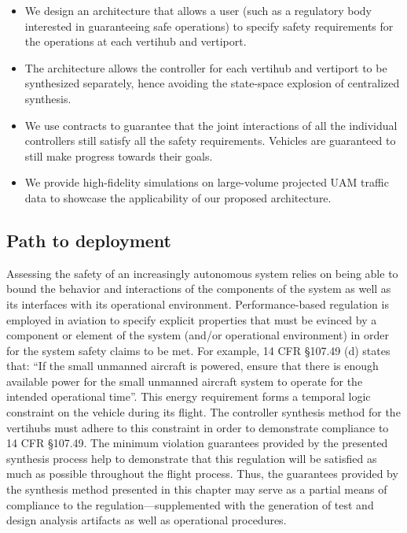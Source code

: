 \begin{itemize}
	\item We design an architecture that allows a user (such as a regulatory body interested in guaranteeing safe operations) to specify safety requirements for the operations at each vertihub and vertiport. 
	\item The architecture allows the controller for each vertihub and vertiport to be synthesized separately, hence avoiding the state-space explosion of centralized synthesis. 
	\item We use contracts to guarantee that the joint interactions of all the individual controllers still satisfy all the safety requirements. Vehicles are guaranteed to still make progress towards their goals. 
	\item We provide high-fidelity simulations on large-volume projected UAM traffic data to showcase the applicability of our proposed architecture.
\end{itemize}

\subsection{Path to deployment}

Assessing the safety of an increasingly autonomous system relies on being able to bound the behavior and interactions of the components of the system as well as its interfaces with its operational environment. Performance-based regulation is employed in aviation to specify explicit properties that must be evinced by a component or element of the system (and/or operational environment) in order for the system safety claims to be met.  For example, 14 CFR \S 107.49 (d) states that: “If the small unmanned aircraft is powered, ensure that there is enough available power for the small unmanned aircraft system to operate for the intended operational time”.  This energy requirement forms a temporal logic constraint on the vehicle during its flight. The controller synthesis method for the vertihubs must adhere to this constraint in order to demonstrate compliance to 14 CFR \S 107.49.  The minimum violation guarantees provided by the presented synthesis process help to demonstrate that this regulation will be satisfied as much as possible throughout the flight process.  Thus, the guarantees provided by the synthesis method presented in this chapter may serve as a partial means of compliance to the regulation---supplemented with the generation of test and design analysis artifacts as well as operational procedures.

